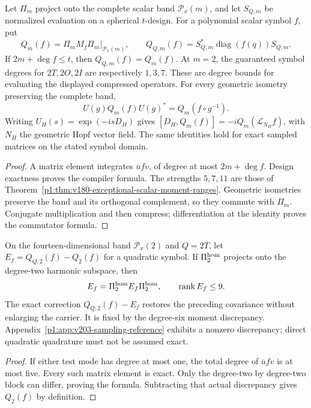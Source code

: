 \documentclass[11pt]{article}
\begin{document}
\begin{theorem}
\label{p1:thm:v203-scalar-observable-compiler}
Let $\Pi_m$ project onto the complete scalar band $\mathcal P_x(m)$,
and let $S_{Q,m}$ be normalized evaluation on a spherical $t$-design.
For a polynomial scalar symbol $f$, put
\[
 Q_m(f)=\Pi_mM_f\Pi_m|_{\mathcal P_x(m)},\qquad
 Q_{Q,m}(f)=S_{Q,m}^*\operatorname{diag}(f(q))S_{Q,m}.
\]
If $2m+\deg f\le t$, then $Q_{Q,m}(f)=Q_m(f)$. At $m=2$, the
guaranteed symbol degrees for $2T,2O,2I$ are respectively $1,3,7$.
These are degree bounds for evaluating the displayed compressed operators.
For every geometric isometry preserving the complete band,
\[
 U(g)Q_m(f)U(g)^*=Q_m(f\circ g^{-1}).
\]
Writing $U_H(s)=\exp(-isD_H)$ gives
$[D_H,Q_m(f)]=-i Q_m(\mathcal L_{N_H}f)$, with $N_H$ the
geometric Hopf vector field. The same identities hold for exact sampled
matrices on the stated symbol domain.
\end{theorem}
\begin{proof}
A matrix element integrates $\overline u f v$, of degree at most
$2m+\deg f$. Design exactness proves the compiler formula. The strengths
$5,7,11$ are those of
Theorem~\ref{p1:thm:v180-exceptional-scalar-moment-ranges}.
Geometric isometries preserve the band and its orthogonal complement, so
they commute with $\Pi_m$. Conjugate multiplication and then compress;
differentiation at the identity proves the commutator formula.
\end{proof}

\begin{corollary}
\label{p1:cor:v203-quadratic-top-block-correction}
On the fourteen-dimensional band $\mathcal P_x(2)$ and $Q=2T$, let
$E_f=Q_{Q,2}(f)-Q_2(f)$ for a quadratic symbol. If $\Pi_2^{\rm hom}$
projects onto the degree-two harmonic subspace, then
\[
 E_f=\Pi_2^{\rm hom}E_f\Pi_2^{\rm hom},\qquad
 \operatorname{rank}E_f\le9.
\]
The exact correction $Q_{Q,2}(f)-E_f$ restores the preceding covariance
without enlarging the carrier. It is fixed by the degree-six moment
discrepancy. Appendix~\ref{p1:app:v203-sampling-reference} exhibits a
nonzero discrepancy; direct quadratic quadrature must not be assumed exact.
\end{corollary}
\begin{proof}
If either test mode has degree at most one, the total degree of
$\overline u f v$ is at most five. Every such matrix element is exact.
Only the degree-two by degree-two block can differ, proving the formula.
Subtracting that actual discrepancy gives $Q_2(f)$ by definition.
\end{proof}
\end{document}
